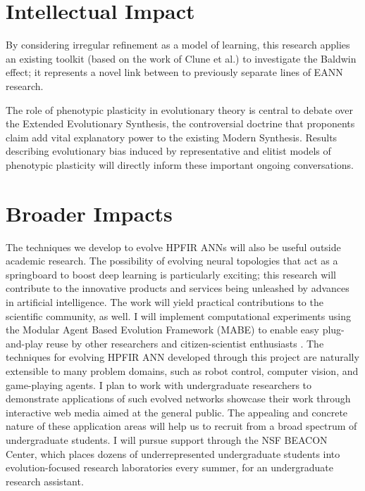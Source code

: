 \section{Intellectual Impact}

By considering irregular refinement as a model of learning, this research applies an existing toolkit (based on the work of Clune et al.) to investigate the Baldwin effect;
it represents a novel link between to previously separate lines of EANN research.\autocite{Clune2011OnRegularity,Downing2010TheNetworks}

The role of phenotypic plasticity in evolutionary theory is central to debate over the Extended Evolutionary Synthesis, the controversial doctrine that proponents claim add vital explanatory power to the existing Modern Synthesis.\autocite{Laland2014DoesRethink}
Results describing evolutionary bias induced by representative and elitist models of phenotypic plasticity will directly inform these important ongoing conversations.

\section{Broader Impacts}

The techniques we develop to evolve HPFIR ANNs will also be useful outside academic research.
The possibility of evolving neural topologies that act as a springboard to boost deep learning is particularly exciting; this research will contribute to the innovative products and services being unleashed by advances in artificial intelligence.
The work will yield practical contributions to the scientific community, as well.
I will implement computational experiments using the Modular Agent Based Evolution Framework (MABE) to enable easy plug-and-play reuse by other researchers and citizen-scientist enthusiasts \autocite{Hintze2017Mabe}.
The techniques for evolving HPFIR ANN developed through this project are naturally extensible to many problem domains, such as robot control, computer vision, and game-playing agents.
I plan to work with undergraduate researchers to demonstrate applications of such evolved networks showcase their work through interactive web media aimed at the general public.
The appealing and concrete nature of these application areas will help us to recruit from a broad spectrum of undergraduate students.
I will pursue support through the NSF BEACON Center, which places dozens of underrepresented undergraduate students into evolution-focused research laboratories every summer, for an undergraduate research assistant.
